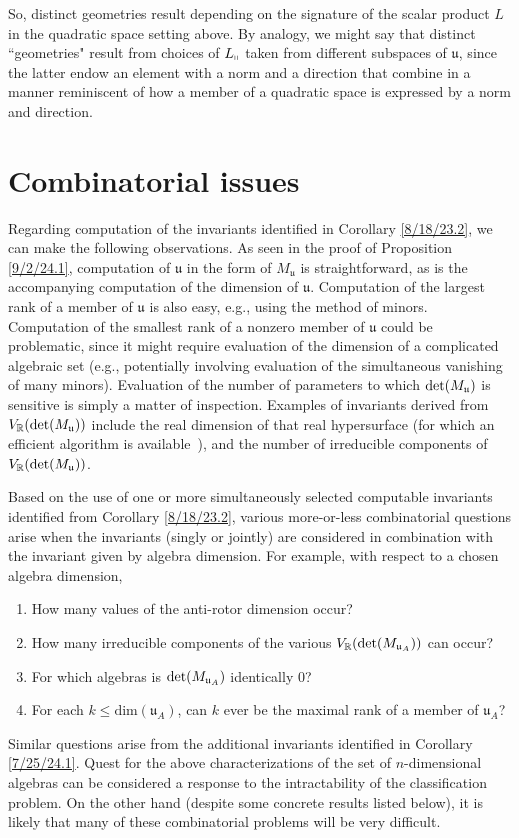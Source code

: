 \documentclass{amsart}
\numberwithin{equation}{section}
\theoremstyle{definition}
\numberwithin{theorem}{section}
\begin{document}
So, distinct geometries result depending on the signature of the scalar product $L$ in the quadratic space setting above.  By analogy, we might say that distinct ``geometries" result from choices of $L_{\shortparallel}$ taken from different subspaces of $\mathfrak{u}$, since the latter endow an element with a norm and a direction that combine in a manner reminiscent of how a member of a quadratic space is expressed by a norm and direction. 


\section{Combinatorial issues}
Regarding computation of the invariants identified in Corollary \ref{8/18/23.2}, we can make the following observations.  As seen in the proof of Proposition \ref{9/2/24.1}, computation of $\mathfrak{u}$ in the form of $M_\mathfrak{u}$ is straightforward, as is the accompanying computation of the dimension of $\mathfrak{u}$.   Computation of the largest rank of a member of $\mathfrak{u}$ is also easy, e.g., using the method of minors.  Computation of the smallest rank of a nonzero member of $\mathfrak{u}$ could be problematic, since it might require evaluation of the dimension of a complicated algebraic set (e.g., potentially involving evaluation of the simultaneous vanishing of many minors).  Evaluation of the number of parameters to which ${\rm det}(M_{\mathfrak{u}})$ is sensitive is simply a matter of inspection.  Examples of invariants derived from $V_\mathbb{R}({\rm det}(M_{\mathfrak{u}}))$ include the real dimension of that real hypersurface (for which an efficient algorithm is \mbox{available \cite{bannwarth:2015})}, and the number of irreducible components of $V_\mathbb{R}({\rm det}(M_{\mathfrak{u}}))$.  

 
Based on the use of one or more simultaneously selected computable invariants identified from Corollary \ref{8/18/23.2}, various more-or-less combinatorial questions arise when the invariants (singly or jointly) are considered in combination with the invariant given by algebra dimension.  For example, with respect to a chosen algebra dimension,  

\begin{enumerate} \item How many values of the anti-rotor dimension occur?  \item How many irreducible components of the various $V_\mathbb{R}({\rm det}(M_{\mathfrak{u}_A}))$ can occur?  \item For which algebras is ${\rm det}(M_{\mathfrak{u}_A})$ identically $0$?  \item For each $k\le \text{dim}(\mathfrak{u}_A)$, can $k$ ever be the maximal rank of a member of $\mathfrak{u}_A$?   \end{enumerate}  
Similar questions arise from the additional invariants identified in Corollary \ref{7/25/24.1}.  Quest for the above characterizations of the set of $n$-dimensional algebras can be considered a response to the intractability of the classification problem.  On the other hand (despite some concrete results listed below), it is likely that many of these combinatorial problems will be very difficult.
\end{document}
